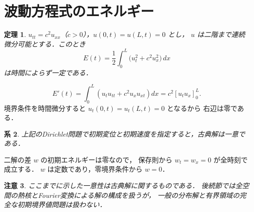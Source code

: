 \documentclass[a5paper,10pt,onecolumn]{jsarticle}
\makeatletter
\theoremstyle{mathnotetheorem}
\newtheorem{theorem}{定理}[section]
\newtheorem{corollary}[theorem]{系}
\newtheorem{remark}[theorem]{注意}
\renewcommand{\proofname}{証明}
\renewenvironment{proof}[1][\proofname]{%
  \par\pushQED{\qed}\normalfont\topsep4\p@\@plus2\p@\relax
  \trivlist\item[\hskip\labelsep\bfseries #1]\ignorespaces
}{\popQED\endtrivlist\@endpefalse}
\makeatother
\begin{document}
\section{波動方程式のエネルギー}
\begin{theorem}
$u_{tt}=c^2u_{xx}$（$c>0$），$u(0,t)=u(L,t)=0$ とし，
$u$ は二階まで連続微分可能とする．このとき
\[
 E(t)=\frac12\int_0^L\bigl(u_t^2+c^2u_x^2\bigr)\,dx
\]
は時間によらず一定である．
\end{theorem}
\begin{proof}
\[
 E'(t)=\int_0^L(u_tu_{tt}+c^2u_xu_{xt})dx
 =c^2[u_tu_x]_0^L.
\]
境界条件を時間微分すると $u_t(0,t)=u_t(L,t)=0$ となるから
右辺は零である．
\end{proof}
\begin{corollary}
上記のDirichlet問題で初期変位と初期速度を指定すると，古典解は一意である．
\end{corollary}
\begin{proof}
二解の差 $w$ の初期エネルギーは零なので，
保存則から $w_t=w_x=0$ が全時刻で成立する．
$w$ は定数であり，零境界条件から $w=0$．
\end{proof}
\begin{remark}
ここまでに示した一意性は古典解に関するものである．
後続節では全空間の熱核とFourier変換による解の構成を扱うが，
一般の分布解と有界領域の完全な初期境界値問題は扱わない．
\end{remark}
\end{document}
